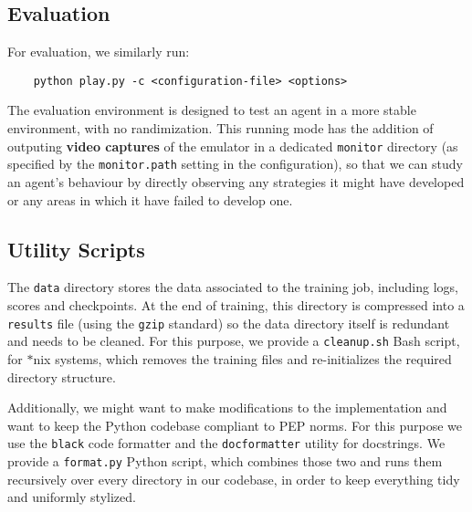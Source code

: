 \subsection*{Evaluation}
For evaluation, we similarly run:
\begin{verbatim}
    python play.py -c <configuration-file> <options>
\end{verbatim}

The evaluation environment is designed to test an agent in a more stable environment, with no randimization.
This running mode has the addition of outputing \textbf{video captures} of the emulator in a dedicated \verb|monitor| directory (as specified by the \verb|monitor.path| setting in the configuration), so that we can study an agent's behaviour by directly observing any strategies it might have developed or any areas in which it have failed to develop one.

\subsection*{Utility Scripts}
The \verb|data| directory stores the data associated to the training job, including logs, scores and checkpoints.
At the end of training, this directory is compressed into a \verb|results| file (using the \verb|gzip| standard) so the data directory itself is redundant and needs to be cleaned.
For this purpose, we provide a \verb|cleanup.sh| Bash script, for $*$nix systems, which removes the training files and re-initializes the required directory structure.

Additionally, we might want to make modifications to the implementation and want to keep the Python codebase compliant to PEP norms.
For this purpose we use the \verb|black| code formatter and the \verb|docformatter| utility for docstrings.
We provide a \verb|format.py| Python script, which combines those two and runs them recursively over every directory in our codebase, in order to keep everything tidy and uniformly stylized.

